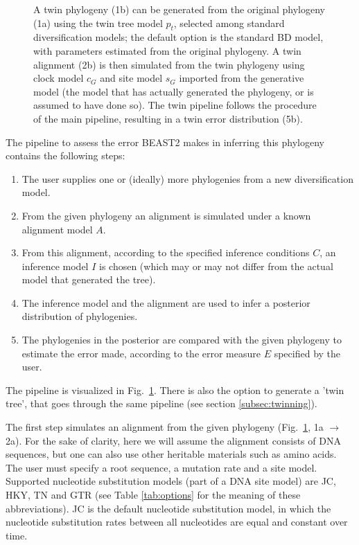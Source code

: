 \begin{figure}
{    A twin phylogeny (1b) can be generated from the original 
    phylogeny (1a) using the twin tree model $\mathit{p_{t}}$, 
    selected among standard diversification models; 
    the default option is the standard BD model, 
    with parameters estimated from the original phylogeny.
    A twin alignment (2b) is then simulated from the twin phylogeny 
    using clock model $\mathit{c_{G}}$ and site model $\mathit{s_{G}}$ 
    imported from the generative model (the model that has
    actually generated the phylogeny, or is assumed to have done so). 
    The twin pipeline follows the procedure of the main pipeline, 
    resulting in a twin error distribution (5b).
  }
  \label{fig:pipeline}
\end{figure}

The pipeline to assess the error BEAST2 makes in inferring this phylogeny 
contains the following steps:
\begin{enumerate}
  \item The user supplies one or (ideally) more phylogenies from a 
    new diversification model.
  \item From the given phylogeny an alignment is simulated 
    under a known alignment model $\mathit{A}$.
  \item From this alignment, according to the specified 
    inference conditions $\mathit{C}$, 
    an inference model $\mathit{I}$ is chosen (which may or may not differ 
    from the actual model that generated the tree).
  \item The inference model and the alignment are used 
    to infer a posterior distribution of phylogenies.
  \item The phylogenies in the posterior are compared with the given phylogeny 
    to estimate the error made, according to 
    the error measure $\mathit{E}$ specified by the user.
\end{enumerate}

The pipeline is visualized in Fig.~\ref{fig:pipeline}. 
There is also the option to generate a 'twin tree', 
that goes through the same pipeline (see section \ref{subsec:twinning}). 

The first step simulates an alignment from the given 
phylogeny (Fig.~\ref{fig:pipeline}, 1a $\rightarrow$ 2a).
For the sake of clarity, here we will assume the alignment consists
of DNA sequences, but one can also use other heritable materials such as amino acids.
The user must specify a root sequence, a mutation rate and a site model.
Supported nucleotide substitution models (part of a DNA
site model) are JC, HKY, TN and GTR (see Table \ref{tab:options} for
the meaning of these abbreviations).
JC is the default nucleotide substitution model,
in which the nucleotide substitution rates between all
nucleotides are equal and constant over time.

